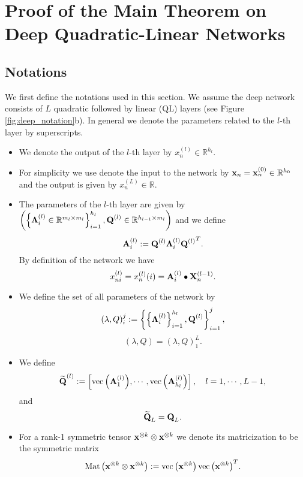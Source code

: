 \documentclass[11pt]{article}
\theoremstyle{plain}
\DeclareMathOperator*{\vectorize}{vec}
\DeclareMathOperator*{\matricize}{Mat}
\def\R{\mathbb{R}}
\theoremstyle{plain}
\numberwithin{equation}{section}
\numberwithin{lemma}{section}
\numberwithin{theorem}{section}
\numberwithin{corollary}{section}
\numberwithin{observation}{section}
\numberwithin{definition}{section}
\numberwithin{example}{section}
\begin{document}
\section{Proof of the Main Theorem on Deep Quadratic-Linear Networks}
\renewcommand{\theequation}{\Alph{section}.\arabic{equation}}
\renewcommand{\thefigure}{\Alph{section}.\arabic{figure}}


\subsection{Notations}
We first define the notations used in this section. We assume the deep network consists of $L$ quadratic followed by linear (QL) layers (see Figure \ref{fig:deep_notation}b). In general we denote the parameters related to the $l$-th layer by superscripts.
\begin{itemize}
    \item We denote the output of the $l$-th layer by $x_n^{(l)} \in \R^{h_l}$. 
\item For simplicity we use denote the input to the network by $\V{x}_n = \V{x}_n^{(0)} \in \R^{h_0}$ and the output is given by ${x}_n^{(L)} \in \R$.
    \item The parameters of the $l$-th layer are given by $\left( \left\{ \Mx{\Lambda}_i^{(l)} \in \R^{m_l \times m_l} \right\}_{i=1}^{h_l}, \Mx{Q}^{(l)} \in \R^{h_{l-1} \times m_l} \right)$ and we define 
    \[
    \Mx{A}_i^{(l)}:=\Mx{Q}^{(l)} \Mx{\Lambda}_i^{(l)} {\Mx{Q}^{(l)}}^T.\]
    By definition of the network we have
    \[
    x_{ni}^{(l)}=x_n^{(l)}(i) = \Mx{A}_i^{(l)} \bullet \Mx{X}_n^{(l-1)}. 
    \]
    \item We define the set of all parameters of the network by 
    \[
     \left(\lambda, Q \right)_i^j: = \left\{ \left\{ \Mx{\Lambda}_{i}^{(l)} \right\}_{i=1}^{h_l}, \Mx{Q}^{(l)}  \right\}_{i=1}^j,
    \] 
    \[
    \left(\lambda, Q \right)=\left(\lambda, Q \right)_1^L.
    \]
\item We define 
    \[
    \widetilde{\Mx{Q}}^{(l)}:=  \left[\vectorize{\left(\Mx{A}_1^{(l)}\right)},\cdots,\vectorize{\left(\Mx{A}_{h_l}^{(l)}\right)} \right], \quad l=1,\cdots,L-1,
    \]
    and
    \[\widetilde{\Mx{Q}}_L =\Mx{Q}_L.\]
\item For a rank-1 symmetric tensor $\V{x}^{\otimes k} \otimes \V{x}^{\otimes k}$ we denote its matricization to be the symmetric matrix
    \[
    \matricize{\left( \V{x}^{\otimes k} \otimes \V{x}^{\otimes k} \right)}: =\vectorize{\left(\V{x}^{\otimes k}\right)} \vectorize{\left(\V{x}^{\otimes k}\right)}^T.
    \]
    
\end{itemize}
\end{document}
